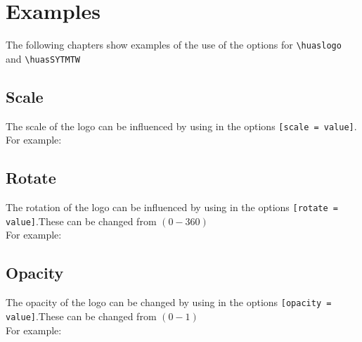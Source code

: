 \documentclass{ltxdoc}
\begin{document}
\section{Examples}
The following chapters show examples of the use of the options for \verb|\huaslogo| and \verb|\huasSYTMTW| 
\subsection{Scale}
The scale of the logo can be influenced by using in the options \verb|[scale = value]|.\\
For example:
\begin{figure}[h]
    \begin{subfigure}[b]{0.45\textwidth}
        \centering
        \huaslogo
        \caption*{\cmd{\huaslogo}}
    \end{subfigure}
    \begin{subfigure}[b]{0.45\textwidth}
        \centering
        \huaslogo[scale = 1.5]
        \caption*{\cmd{\huaslogo[scale = 1.5]}}
    \end{subfigure}
\end{figure}
\subsection{Rotate}
The rotation of the logo can be influenced by using in the options \verb|[rotate = value]|.These can be changed from $(0-360)$\\
For example:
\begin{figure}[h]
    \begin{subfigure}[b]{0.55\textwidth}
        \centering
        \huaslogo[scale = 1.3, rotate = 30]
        \caption*{\cmd{\huaslogo[scale = 1.3, \\ rotate = 30]}}
    \end{subfigure}
    \begin{subfigure}[b]{0.35\textwidth}
        \centering
        \huaslogo[onlylogo, rotate = -90, scale = 3]
        \caption*{\cmd{\huaslogo[onlylogo, rotate = -90, scale = 3]}}
    \end{subfigure}
\end{figure}
\subsection{Opacity}
The opacity of the logo can be changed by using in the options \verb|[opacity = value]|.These can be changed from $(0-1)$\\
For example:
\begin{figure}[H]
    \centering
    \huaslogo[scale = 2, opacity = 0.5]
    \caption*{\cmd{\huaslogo[scale = 2, opacity = 0.5]}}
\end{figure}
\end{document}
